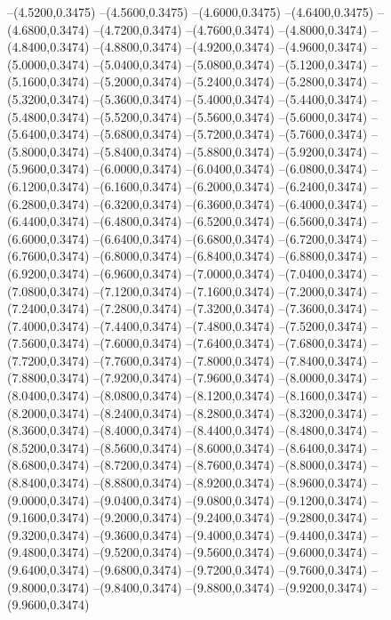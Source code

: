 {	--(4.5200,0.3475)
	--(4.5600,0.3475)
	--(4.6000,0.3475)
	--(4.6400,0.3475)
	--(4.6800,0.3474)
	--(4.7200,0.3474)
	--(4.7600,0.3474)
	--(4.8000,0.3474)
	--(4.8400,0.3474)
	--(4.8800,0.3474)
	--(4.9200,0.3474)
	--(4.9600,0.3474)
	--(5.0000,0.3474)
	--(5.0400,0.3474)
	--(5.0800,0.3474)
	--(5.1200,0.3474)
	--(5.1600,0.3474)
	--(5.2000,0.3474)
	--(5.2400,0.3474)
	--(5.2800,0.3474)
	--(5.3200,0.3474)
	--(5.3600,0.3474)
	--(5.4000,0.3474)
	--(5.4400,0.3474)
	--(5.4800,0.3474)
	--(5.5200,0.3474)
	--(5.5600,0.3474)
	--(5.6000,0.3474)
	--(5.6400,0.3474)
	--(5.6800,0.3474)
	--(5.7200,0.3474)
	--(5.7600,0.3474)
	--(5.8000,0.3474)
	--(5.8400,0.3474)
	--(5.8800,0.3474)
	--(5.9200,0.3474)
	--(5.9600,0.3474)
	--(6.0000,0.3474)
	--(6.0400,0.3474)
	--(6.0800,0.3474)
	--(6.1200,0.3474)
	--(6.1600,0.3474)
	--(6.2000,0.3474)
	--(6.2400,0.3474)
	--(6.2800,0.3474)
	--(6.3200,0.3474)
	--(6.3600,0.3474)
	--(6.4000,0.3474)
	--(6.4400,0.3474)
	--(6.4800,0.3474)
	--(6.5200,0.3474)
	--(6.5600,0.3474)
	--(6.6000,0.3474)
	--(6.6400,0.3474)
	--(6.6800,0.3474)
	--(6.7200,0.3474)
	--(6.7600,0.3474)
	--(6.8000,0.3474)
	--(6.8400,0.3474)
	--(6.8800,0.3474)
	--(6.9200,0.3474)
	--(6.9600,0.3474)
	--(7.0000,0.3474)
	--(7.0400,0.3474)
	--(7.0800,0.3474)
	--(7.1200,0.3474)
	--(7.1600,0.3474)
	--(7.2000,0.3474)
	--(7.2400,0.3474)
	--(7.2800,0.3474)
	--(7.3200,0.3474)
	--(7.3600,0.3474)
	--(7.4000,0.3474)
	--(7.4400,0.3474)
	--(7.4800,0.3474)
	--(7.5200,0.3474)
	--(7.5600,0.3474)
	--(7.6000,0.3474)
	--(7.6400,0.3474)
	--(7.6800,0.3474)
	--(7.7200,0.3474)
	--(7.7600,0.3474)
	--(7.8000,0.3474)
	--(7.8400,0.3474)
	--(7.8800,0.3474)
	--(7.9200,0.3474)
	--(7.9600,0.3474)
	--(8.0000,0.3474)
	--(8.0400,0.3474)
	--(8.0800,0.3474)
	--(8.1200,0.3474)
	--(8.1600,0.3474)
	--(8.2000,0.3474)
	--(8.2400,0.3474)
	--(8.2800,0.3474)
	--(8.3200,0.3474)
	--(8.3600,0.3474)
	--(8.4000,0.3474)
	--(8.4400,0.3474)
	--(8.4800,0.3474)
	--(8.5200,0.3474)
	--(8.5600,0.3474)
	--(8.6000,0.3474)
	--(8.6400,0.3474)
	--(8.6800,0.3474)
	--(8.7200,0.3474)
	--(8.7600,0.3474)
	--(8.8000,0.3474)
	--(8.8400,0.3474)
	--(8.8800,0.3474)
	--(8.9200,0.3474)
	--(8.9600,0.3474)
	--(9.0000,0.3474)
	--(9.0400,0.3474)
	--(9.0800,0.3474)
	--(9.1200,0.3474)
	--(9.1600,0.3474)
	--(9.2000,0.3474)
	--(9.2400,0.3474)
	--(9.2800,0.3474)
	--(9.3200,0.3474)
	--(9.3600,0.3474)
	--(9.4000,0.3474)
	--(9.4400,0.3474)
	--(9.4800,0.3474)
	--(9.5200,0.3474)
	--(9.5600,0.3474)
	--(9.6000,0.3474)
	--(9.6400,0.3474)
	--(9.6800,0.3474)
	--(9.7200,0.3474)
	--(9.7600,0.3474)
	--(9.8000,0.3474)
	--(9.8400,0.3474)
	--(9.8800,0.3474)
	--(9.9200,0.3474)
	--(9.9600,0.3474)
}
